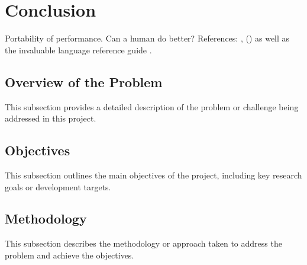 % 

\section{Conclusion}  %
Portability	of performance. Can a human do better? References: \cite{numrich2018parallel, ray2019fortran}, (\cite{markus2012modern, clerman2011modern, Hanson2013}) as well as the invaluable language reference guide \cite{metcalf2024modern}.	

\subsection{Overview of the Problem}
This subsection provides a detailed description of the problem or challenge being addressed in this project.

\subsection{Objectives}
This subsection outlines the main objectives of the project, including key research goals or development targets.

\subsection{Methodology}
This subsection describes the methodology or approach taken to address the problem and achieve the objectives.

\endinput  %
